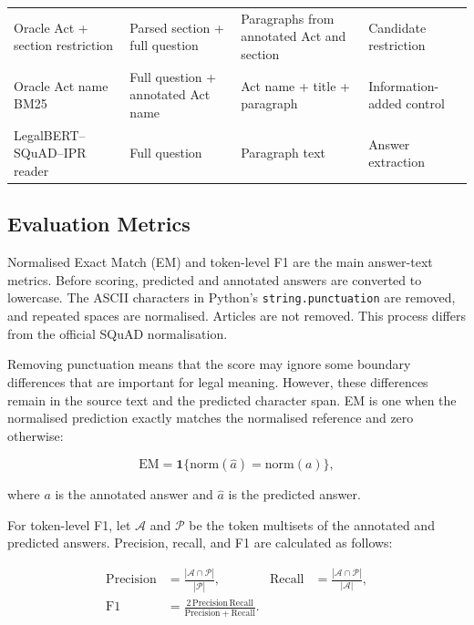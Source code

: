 \documentclass[pdflatex,sn-basic]{sn-jnl}%
\theoremstyle{thmstyleone}%
\theoremstyle{thmstyletwo}%
\theoremstyle{thmstylethree}%
\newcommand{\fixedreader}{LegalBERT--SQuAD--IPR}
\begin{document}
\begin{table}[!htbp]
\begin{tabular}{@{}
        >{\raggedright\arraybackslash}p{2.7cm}
        >{\raggedright\arraybackslash}p{2.5cm}
        >{\raggedright\arraybackslash}p{4.8cm}
        >{\raggedright\arraybackslash}p{2.3cm}@{}}
        Oracle Act + section restriction
        & Parsed section + full question
        & Paragraphs from annotated Act and section
        & Candidate restriction \\

        Oracle Act name BM25
        & Full question + annotated Act name
        & Act name + title + paragraph
        & Information-added control \\

        \fixedreader{} reader
        & Full question
        & Paragraph text
        & Answer extraction \\
        \bottomrule
    \end{tabular}
\end{table}

\subsection{Evaluation Metrics}

Normalised Exact Match (EM) and token-level F1 are the main answer-text
metrics. Before scoring, predicted and annotated answers are converted to
lowercase. The ASCII characters in Python's
\texttt{string.punctuation} are removed, and repeated spaces are normalised.
Articles are not removed. This process differs from the official SQuAD
normalisation.

Removing punctuation means that the score may ignore some boundary differences
that are important for legal meaning. However, these differences remain in the
source text and the predicted character span. EM is one when the normalised
prediction exactly matches the normalised reference and zero otherwise:

\begin{equation}
    \mathrm{EM}
    =\mathbf{1}\{\mathrm{norm}(\hat{a})=\mathrm{norm}(a)\},
    \label{eq:em}
\end{equation}

where $a$ is the annotated answer and $\hat{a}$ is the predicted answer.

For token-level F1, let $\mathcal{A}$ and $\mathcal{P}$ be the token
multisets of the annotated and predicted answers. Precision, recall, and F1
are calculated as follows:

\begin{align}
    \mathrm{Precision}
    &= \frac{|\mathcal{A}\cap\mathcal{P}|}{|\mathcal{P}|}, &
    \mathrm{Recall}
    &= \frac{|\mathcal{A}\cap\mathcal{P}|}{|\mathcal{A}|}, \\
    \mathrm{F1}
    &= \frac{2\,\mathrm{Precision}\,\mathrm{Recall}}
    {\mathrm{Precision}+\mathrm{Recall}}.
    \label{eq:f1}
\end{align}
\end{document}
